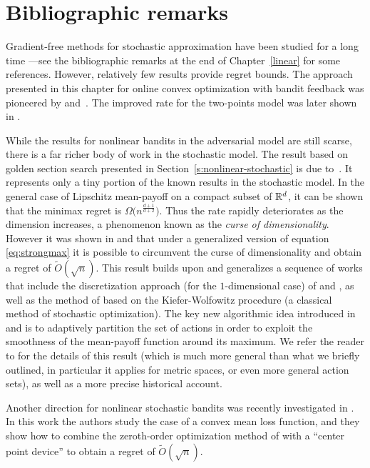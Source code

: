\section{Bibliographic remarks}
Gradient-free methods for stochastic approximation have been studied for a long time ---see the bibliographic remarks at the end of Chapter~\ref{linear} for some references. However, relatively few results provide regret bounds. The approach presented in this chapter for online convex optimization with bandit feedback was pioneered by \citep{FKM05} and~\citep{kleinberg2004nearly}. The improved rate for the two-points model was later shown in \cite{ADX10}. 

While the results for nonlinear bandits in the adversarial model are still scarse, there is a far richer body of work in the stochastic model. The result based on golden section search presented in Section~\ref{s:nonlinear-stochastic} is due to~\citep{yu2011unimodal}. It represents only a tiny portion of the known results in the stochastic model. In the general case of Lipschitz mean-payoff on a compact subset of $\mathbb{R}^d$, it can be shown that the minimax regret is $\Omega\bigl(n^{\frac{d+1}{d+2}}\bigr)$. Thus the rate rapidly deteriorates as the dimension increases, a phenomenon known as the {\em curse of dimensionality}. However it was shown in \citep{KSU08} and \citep{BMSS09} that under a generalized version of equation \eqref{eq:strongmax} it is possible to circumvent the curse of dimensionality and obtain a regret of $\tilde{O}(\sqrt{n})$. This result builds upon and generalizes a sequence of works that include the discretization approach (for the $1$-dimensional case) of \citep{kleinberg2004nearly} and \citep{auer2007improved}, as well as the method of \citep{cope2009regret} based on the Kiefer-Wolfowitz procedure (a classical method of stochastic optimization). The key new algorithmic idea introduced in \citep{KSU08} and \citep{BMSS09}  is to adaptively partition the set of actions in order to exploit the smoothness of the mean-payoff function around its maximum. We refer the reader to \cite{BMSS11} for the details of this result (which is much more general than what we briefly outlined, in particular it applies for metric spaces, or even more general action sets), as well as a more precise historical account. 

Another direction for nonlinear stochastic bandits was recently investigated in \citep{agarwal2011stochastic}. In this work the authors study the case of a convex mean loss function, and they show how to combine the zeroth-order optimization method of \citep{NY83} with a ``center point device'' to obtain a regret of $\tilde{O}(\sqrt{n})$.

